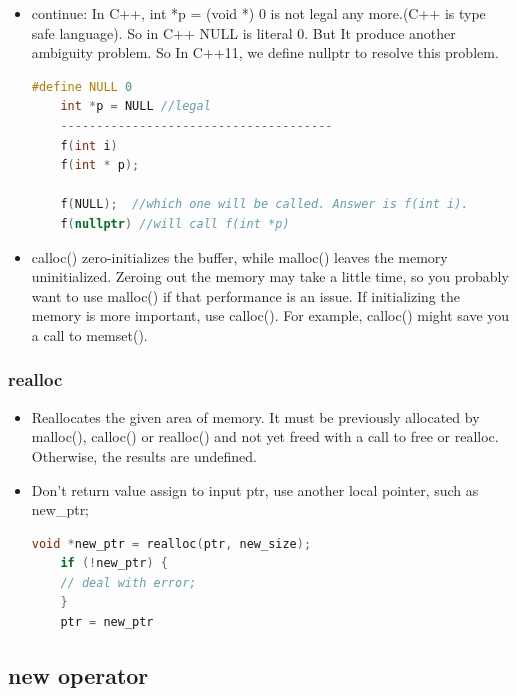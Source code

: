 \documentclass[a4paper,12pt,twoside]{book}
\begin{document}
\begin{itemize}
	\item continue: In C++, int *p = (void *) 0 is not legal any more.(C++ is type safe language).  So in C++ NULL is literal 0. But It produce another ambiguity problem.  So In C++11, we define nullptr to resolve this problem.
	\begin{lstlisting}[frame=single, language=c++]
	#define NULL 0
	int *p = NULL //legal
	--------------------------------------
	f(int i)
	f(int * p);
	
	f(NULL);  //which one will be called. Answer is f(int i).
	f(nullptr) //will call f(int *p)
	\end{lstlisting}
	
	\item calloc() zero-initializes the buffer, while malloc() leaves the memory uninitialized. Zeroing out the memory may take a little time, so you probably want to use malloc() if that performance is an issue. If initializing the memory is more important, use calloc(). For example, calloc() might save you a call to memset().
\end{itemize}

\subsubsection{realloc}
\begin{itemize}
	
	\item Reallocates the given area of memory. It must be previously allocated by malloc(), calloc() or realloc() and not yet freed with a call to free or realloc. Otherwise, the results are undefined.
	
	
	\item Don't return value assign to input ptr, use another local pointer, such as new\_ptr;
	\begin{lstlisting}[frame=single, language=c++]
	void *new_ptr = realloc(ptr, new_size);
	if (!new_ptr) {
	// deal with error;
	}
	ptr = new_ptr
	\end{lstlisting}
\end{itemize}


\subsection{new operator}
\end{document}
